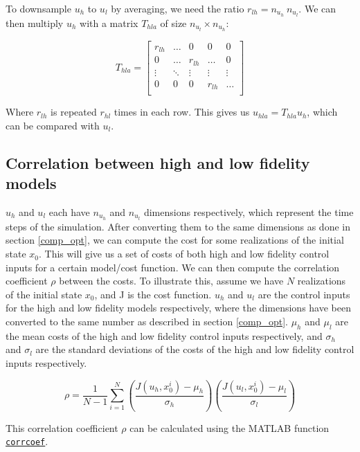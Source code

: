 \documentclass{article}
\begin{document}
To downsample $u_h$ to $u_l$ by averaging, we need the ratio $r_{lh} = n_{u_h} \ n_{u_l}$.
We can then multiply $u_h$ with a matrix $T_{hla}$ of size $n_{u_l} \times n_{u_h}$:

\begin{equation}
  T_{hla} =
  \begin{bmatrix}
    r_{lh} & \ldots & 0 & 0 & 0 \\
    0 & \ldots & r_{lh} & \ldots & 0 \\
    \vdots & \ddots & \vdots & \vdots & \vdots \\
    0 & 0 & 0 & r_{lh} & \ldots \\
  \end{bmatrix}
\end{equation}

Where $r_{lh}$ is repeated $r_{hl}$ times in each row.
This gives us $u_{hla} = T_{hla} u_h$, which can be compared with $u_l$.

\subsection{Correlation between high and low fidelity models}

$u_h$ and $u_l$ each have $n_{u_h}$ and $n_{u_l}$ dimensions respectively, which represent the time steps of the simulation.
After converting them to the same dimensions as done in section \ref{comp_opt},
we can compute the cost for some realizations of the initial state $x_0$.
This will give us a set of costs of both high and low fidelity control inputs for a certain model/cost function.
We can then compute the correlation coefficient $\rho$ between the costs.
To illustrate this, assume we have $N$ realizations of the initial state $x_0$, and J is the cost function.
$u_h$ and $u_l$ are the control inputs for the high and low fidelity models respectively, where the dimensions have been
converted to the same number as described in section \ref{comp_opt}. $\mu_h$ and $\mu_l$ are the mean costs
of the high and low fidelity control inputs respectively, and $\sigma_h$ and $\sigma_l$ are the standard deviations of
the costs of the high and low fidelity control inputs respectively.

\begin{equation}
  \rho = \frac{1}{N-1} \sum_{i=1}^{N} \left( \frac{J(u_h, x_0^i) - \mu_h}{\sigma_h} \right) \left( \frac{J(u_l, x_0^i) - \mu_l}{\sigma_l} \right)
\end{equation}

This correlation coefficient $\rho$ can be calculated using the MATLAB function \href{https://www.mathworks.com/help/matlab/ref/corrcoef.html#bunkaln}{\texttt{corrcoef}}.
\end{document}
